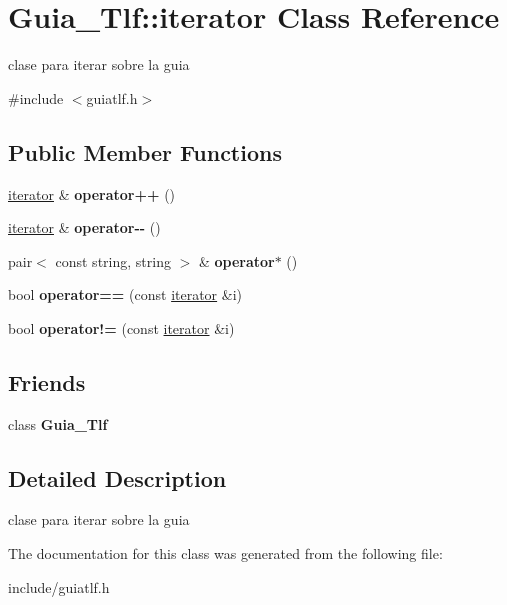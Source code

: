 \hypertarget{classGuia__Tlf_1_1iterator}{}\section{Guia\+\_\+\+Tlf\+:\+:iterator Class Reference}
\label{classGuia__Tlf_1_1iterator}


clase para iterar sobre la guia  




{\ttfamily \#include $<$guiatlf.\+h$>$}

\subsection*{Public Member Functions}
\begin{DoxyCompactItemize}
\item 
\mbox{\label{classGuia__Tlf_1_1iterator_a4edb22003e51ce05bb2be0e0f0f9334d}} 
\mbox{\hyperlink{classGuia__Tlf_1_1iterator}{iterator}} \& {\bfseries operator++} ()
\item 
\mbox{\label{classGuia__Tlf_1_1iterator_a40654c62e5d7fa0c88f41cc8248cba44}} 
\mbox{\hyperlink{classGuia__Tlf_1_1iterator}{iterator}} \& {\bfseries operator-\/-\/} ()
\item 
\mbox{\label{classGuia__Tlf_1_1iterator_a07518d78b4dd17d639bd05f4363e2c2d}} 
pair$<$ const string, string $>$ \& {\bfseries operator$\ast$} ()
\item 
\mbox{\label{classGuia__Tlf_1_1iterator_ab4b046aff7151ba197b789091b65aa49}} 
bool {\bfseries operator==} (const \mbox{\hyperlink{classGuia__Tlf_1_1iterator}{iterator}} \&i)
\item 
\mbox{\label{classGuia__Tlf_1_1iterator_aa7f7981ca6aec075d47618b136904682}} 
bool {\bfseries operator!=} (const \mbox{\hyperlink{classGuia__Tlf_1_1iterator}{iterator}} \&i)
\end{DoxyCompactItemize}
\subsection*{Friends}
\begin{DoxyCompactItemize}
\item 
\mbox{\label{classGuia__Tlf_1_1iterator_a4349d7a1b26a0aa94447235f95b2f940}} 
class {\bfseries Guia\+\_\+\+Tlf}
\end{DoxyCompactItemize}


\subsection{Detailed Description}
clase para iterar sobre la guia 

The documentation for this class was generated from the following file\+:\begin{DoxyCompactItemize}
\item 
include/guiatlf.\+h\end{DoxyCompactItemize}
